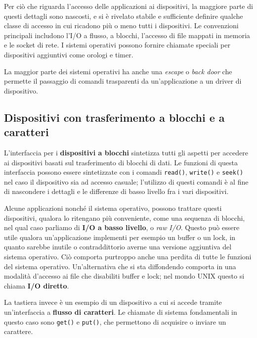     Per ciò che riguarda l'accesso delle applicazioni ai dispositivi, la maggiore parte di questi dettagli sono nascosti, e si è rivelato stabile e sufficiente definire qualche classe di accesso in cui ricadono più o meno tutti i dispositivi. Le convenzioni principali includono l'I/O a flusso, a blocchi, l'accesso di file mappati in memoria e le socket di rete. I sistemi operativi possono fornire chiamate speciali per dispositivi aggiuntivi come orologi e timer.
    
    La maggior parte dei sistemi operativi ha anche una \textit{escape} o \textit{back door} che permette il passaggio di comandi trasparenti da un'applicazione a un driver di dispositivo.
    
    \subsection{Dispositivi con trasferimento a blocchi e a caratteri}
        L'interfaccia per i \textbf{dispositivi a blocchi} sintetizza tutti gli aspetti per accedere ai dispositivi basati sul trasferimento di blocchi di dati. Le funzioni di questa interfaccia possono essere sintetizzate con i comandi \texttt{read()}, \texttt{write()} e \texttt{seek()} nel caso il dispositivo sia ad accesso casuale; l'utilizzo di questi comandi è al fine di nascondere i dettagli e le differenze di basso livello fra i vari dispositivi.
        
        Alcune applicazioni nonché il sistema operativo, possono trattare questi dispositivi, qualora lo ritengano più conveniente, come una sequenza di blocchi, nel qual caso parliamo di \textbf{I/O a basso livello}, o \textit{raw I/O}. Questo può essere utile qualora un'applicazione implementi per esempio un buffer o un lock, in quanto sarebbe inutile o contraddittorio averne una versione aggiuntiva del sistema operativo. Ciò comporta purtroppo anche una perdita di tutte le funzioni del sistema operativo. Un'alternativa che si sta diffondendo comporta in una modalità d'accesso ai file che disabiliti buffer e lock; nel mondo UNIX questo si chiama \textbf{I/O diretto}.
        
        La tastiera invece è un esempio di un dispositivo a cui si accede tramite un'interfaccia a \textbf{flusso di caratteri}. Le chiamate di sistema fondamentali in questo caso sono \texttt{get()} e \texttt{put()}, che permettono di acquisire o inviare un carattere.
        
